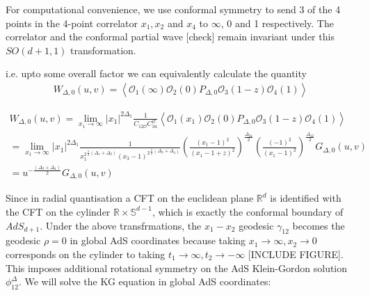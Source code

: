    For computational convenience, we use conformal symmetry to send 3 of the 4 points in the 4-point correlator $x_1, x_2$ and $x_4$ to $\infty$, 0 and 1 respectively. The correlator and the conformal partial wave [check] remain invariant under this $SO(d+1,1)$ transformation.
   
  i.e. upto some overall factor we can equivalently calculate the quantity 
  \begin{align*}
  W_{\Delta,0}(u,v)= \left\langle \mathcal{O}_1(\infty) \mathcal{O}_2(0) P_{\Delta,0} \mathcal{O}_3(1-z) \mathcal{O}_4(1)\right\rangle \label{partialwave}
  \end{align*}
 
  \begin{multline}
  W_{\Delta,0}(u,v) = \lim_{x_1 \to \infty} |x_1|^{2\Delta_1} \frac{1}{C_{12\mathcal{O}}C_{34}^{\mathcal{O}}} \left\langle \mathcal{O}_1(x_1) \mathcal{O}_2(0) P_{\Delta,0} \mathcal{O}_3(1-z) \mathcal{O}_4(1)\right\rangle \\ = \lim_{x_1 \to \infty} |x_1|^{2\Delta_1}  \frac{1}{{x_{1}^2}^{\frac{1}{2}(\Delta_1+\Delta_2)}{(x_{3}-1)^2}^{\frac{1}{2}(\Delta_3+\Delta_4)}} \left(\frac{(x_{1}-1)^2} {(x_{1}-1+z)^2}\right)^\frac{\Delta_{34}}{2} \left(\frac{(-1)^2}{(x_{1}-1)^2}\right)^\frac{\Delta_{12}}{2} G_{\Delta,0}(u,v) \\ = u^{-\frac{(\Delta_3+\Delta_4)}{2}} G_{\Delta,0}(u,v)
  \end{multline}
 
  Since in radial quantisation a CFT on the euclidean plane $\mathbb{R}^d$ is identified with the CFT on the cylinder $\mathbb{R}\times \mathbb{S}^{d-1}$, which is exactly the conformal boundary of $AdS_{d+1}$. Under the above transfrmations, the $x_1 - x_2$ geodesic $\gamma_{12}$ becomes the geodesic $\rho=0$ in global AdS coordinates because taking $x_1 \to \infty, x_2 \to 0$ corresponds on the cylinder to taking $t_1 \to \infty, t_2 \to -\infty$ [INCLUDE FIGURE]. This imposes additional rotational symmetry on the AdS Klein-Gordon solution $\phi_{12}^\Delta$. We will solve the KG equation in global AdS coordinates:
  
